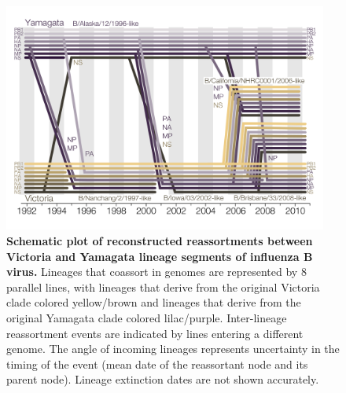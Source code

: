 \documentclass[11pt,oneside,letterpaper]{article}
\begin{document}
\begin{figure}[h]
	\centering		
	\includegraphics[width=0.95\textwidth]{figures/RailroadPlotDated.pdf}
	\caption{\textbf{Schematic plot of reconstructed reassortments between Victoria and Yamagata lineage segments of influenza B virus.}
Lineages that coassort in genomes are represented by 8 parallel lines, with lineages that derive from the original Victoria clade colored yellow/brown and lineages that derive from the original Yamagata clade colored lilac/purple.
Inter-lineage reassortment events are indicated by lines entering a different genome.
The angle of incoming lineages represents uncertainty in the timing of the event (mean date of the reassortant node and its parent node).
Lineage extinction dates are not shown accurately.}
	\label{railroadPlot}
\end{figure}
\end{document}
